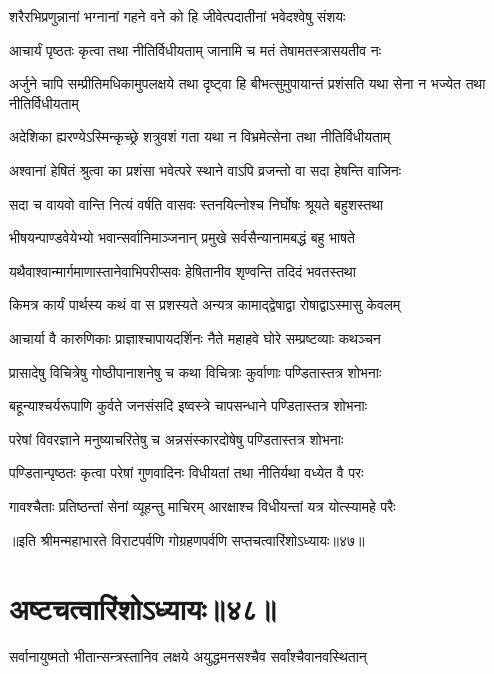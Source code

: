 \twolineshloka
{शरैरभिप्रणुन्नानां भग्नानां गहने वने}
{को हि जीवेत्पदातीनां भवेदश्वेषु संशयः}


\twolineshloka
{आचार्यं पृष्ठतः कृत्वा तथा नीतिर्विधीयताम्}
{जानामि च मतं तेषामतस्त्रासयतीव नः}


\threelineshloka
{अर्जुने चापि सम्प्रीतिमधिकामुपलक्षये}
{तथा दृष्ट्वा हि बीभत्सुमुपायान्तं प्रशंसति}
{यथा सेना न भज्येत तथा नीतिर्विधीयताम्}


\twolineshloka
{अदेशिका ह्यरण्येऽस्मिन्कृच्छ्रे शत्रुवशं गता}
{यथा न विभ्रमेत्सेना तथा नीतिर्विधीयताम्}


\twolineshloka
{अश्वानां हेषितं श्रुत्वा का प्रशंसा भवेत्परे}
{स्थाने वाऽपि व्रजन्तो वा सदा हेषन्ति वाजिनः}


\twolineshloka
{सदा च वायवो वान्ति नित्यं वर्षति वासवः}
{स्तनयित्नोश्च निर्घोषः श्रूयते बहुशस्तथा}


\twolineshloka
{भीषयन्पाण्डवेयेभ्यो भवान्सर्वानिमाञ्जनान्}
{प्रमुखे सर्वसैन्यानामबद्धं बहु भाषते}


\twolineshloka
{यथैवाश्वान्मार्गमाणास्तानेवाभिपरीप्सवः}
{हेषितानीव शृण्वन्ति तदिदं भवतस्तथा}


\twolineshloka
{किमत्र कार्यं पार्थस्य कथं वा स प्रशस्यते}
{अन्यत्र कामाद्द्वेषाद्वा रोषाद्वाऽस्मासु केवलम्}


\twolineshloka
{आचार्या वै कारुणिकाः प्राज्ञाश्चापायदर्शिनः}
{नैते महाहवे घोरे सम्प्रष्टव्याः कथञ्चन}


\twolineshloka
{प्रासादेषु विचित्रेषु गोष्ठीपानाशनेषु च}
{कथा विचित्राः कुर्वाणाः पण्डितास्तत्र शोभनाः}


\twolineshloka
{बहून्याश्चर्यरूपाणि कुर्वते जनसंसदि}
{इष्वस्त्रे चापसन्धाने पण्डितास्तत्र शोभनाः}


\twolineshloka
{परेषां विवरज्ञाने मनुष्याचरितेषु च}
{अन्नसंस्कारदोषेषु पण्डितास्तत्र शोभनाः}


\twolineshloka
{पण्डितान्पृष्ठतः कृत्वा परेषां गुणवादिनः}
{विधीयतां तथा नीतिर्यथा वध्येत वै परः}


\twolineshloka
{गावश्चैताः प्रतिष्ठन्तां सेनां व्यूहन्तु माचिरम्}
{आरक्षाश्च विधीयन्तां यत्र योत्स्यामहे परैः}

॥इति श्रीमन्महाभारते विराटपर्वणि गोग्रहणपर्वणि सप्तचत्वारिंशोऽध्यायः॥४७॥

\chapter{अष्टचत्वारिंशोऽध्यायः॥४८॥}

\twolineshloka
{सर्वानायुष्मतो भीतान्सन्त्रस्तानिव लक्षये}
{अयुद्धमनसश्चैव सर्वांश्चैवानवस्थितान्}


